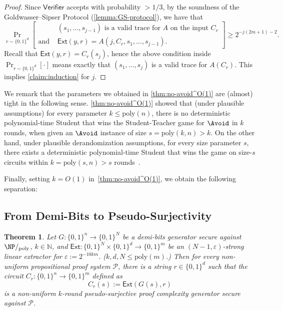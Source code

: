 \documentclass[10pt,a4paper]{article}
\newtheorem{theorem}{Theorem}[section]
\theoremstyle{definition}
\theoremstyle{remark}
\renewcommand{\poly}{\mathrm{poly}}
\newcommand{\eps}{\varepsilon}
\newcommand{\Ext}{\mathsf{Ext}}
\newcommand{\calP}{\mathcal{P}}
\newcommand{\N}{\mathbb{N}}
\newcommand{\Verifier}{\mathsf{Verifier}}
\begin{document}
\begin{proof}
Since $\Verifier$ accepts with probability $>1/3$, by the soundness of the Goldwasser--Sipser Protocol (\autoref{lemma:GS-protocol}), we have that
\[\Pr_{r\sim \{0,1\}^d}\left[\begin{aligned}
                &(s_1, \dots, s_{j-1})\text{ is a valid trace for $A$ on the input $C_r$}\\
                \text{and }&\Ext(y, r) = A(j, C_r, s_1, \dots, s_{j-1}).
            \end{aligned}\right] \ge 2^{-j(2m+1)-2}.\]
Recall that $\Ext(y, r) = C_r(s_j)$, hence the above condition inside $\Pr_{r\sim \{0,1\}^d}[\cdot]$ means exactly that $(s_1, \dots, s_j)$ is a valid trace for $A(C_r)$. This implies \autoref{claim:induction} for $j$.
\end{proof}


We remark that the parameters we obtained in \autoref{thm:no-avoid^O(1)} are (almost) tight in the following sense. \autoref{thm:no-avoid^O(1)} showed that (under plausible assumptions) for every parameter $k\le \poly(n)$, there is no deterministic polynomial-time Student that wins the Student-Teacher game for $\Avoid$ in $k$ rounds, when given an $\Avoid$ instance of size $s = \poly(k, n) > k$. On the other hand, under plausible derandomization assumptions, for every size parameter $s$, there exists a deterministic polynomial-time Student that wins the game on size-$s$ circuits within $k = \poly(s, n) > s$ rounds~\cite[Appendix A]{DBLP:conf/stoc/IlangoLW23}. 

Finally, setting $k=O(1)$ in~\autoref{thm:no-avoid^O(1)}, we obtain the following separation:

\ThmPVvsAPC*



\subsection{From Demi-Bits to Pseudo-Surjectivity}\label{sec: pseudosurjectivity}

\begin{theorem}\label{thm:pseudo-pcg-fix}
    Let $G:\{0,1\}^n\to\{0,1\}^N$ be a demi-bits generator secure against $\NP/_{\poly}$, $k\in\N$, and $\Ext:\{0,1\}^N\times\{0,1\}^d\to\{0,1\}^m$ be an $(N-1,\eps)$-strong linear extractor for $\eps:=2^{-10km}$. ($k,d,N\leq\poly(m)$.) Then for every non-uniform propositional proof system $\calP$, there is a string $r\in\{0,1\}^d$ such that the circuit $C_r: \{0,1\}^n\to \{0,1\}^m$ defined as
    \[C_r(s) := \Ext(G(s), r)\]
    is a non-uniform $k$-round pseudo-surjective proof complexity generator secure against $\calP$.
\end{theorem}
\end{document}
